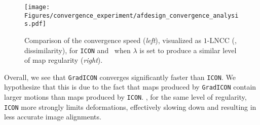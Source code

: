 \begin{figure}[htp]
	\centering
	\texttt{[image: Figures/convergence\_experiment/afdesign\_convergence\_analysis.pdf]}
	\caption{Comparison of the convergence speed (\emph{left}), visualized as $1$-LNCC (\ie, dissimilarity), for \texttt{ICON} and \gradicon~when $\lambda$ is set to produce a similar level of map regularity (\emph{right}).
		\label{Fig:exp_convergence_experiment}}
	\vspace{-0.25cm}
\end{figure}

Overall, we see that \texttt{GradICON} converges significantly faster than
\texttt{ICON}. We hypothesize that this is due to the fact that maps produced
by \texttt{GradICON} contain larger motions than maps produced by
\texttt{ICON}. \ie, for the same level of regularity, \texttt{ICON} more
strongly limits deformations, effectively slowing down and resulting in less
accurate image alignments.

\vspace{-0.15cm}
